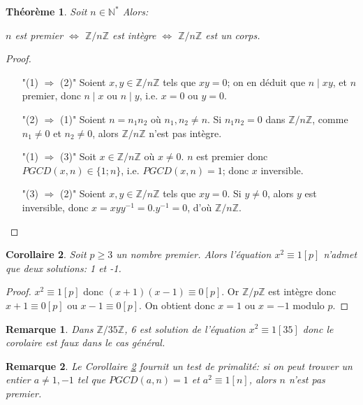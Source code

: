 \documentclass[10pt,a4paper]{report}
\newtheorem{thm}{Théorème}[chapter]
\newtheorem*{rem}{Remarque}
\newtheorem{Cor}[thm]{Corollaire}
\begin{document}
\begin{thm}
Soit $n \in \mathbb{N}^*$ Alors:\par 
$n$ est premier $\Longleftrightarrow$ $\mathbb{Z} / n \mathbb{Z}$ est intègre $\Longleftrightarrow$ $\mathbb{Z}/n\mathbb{Z}$ est un corps.
\end{thm}


\begin{proof}\
\begin{itemize}
\item["(1) $ \Rightarrow$ (2)"] Soient $x,y \in \mathbb{Z}/n\mathbb{Z}$ tels que $xy=0$; on en déduit que $n \mid xy$, et $n$ premier, donc $n \mid x$ ou $n \mid y$, i.e. $x=0$ ou $y=0$.
\item["(2) $\Rightarrow$ (1)"] Soient $n=n_1 n_2$ où $n_1,n_2 \neq n$. Si $n_1 n_2=0$ dans $\mathbb{Z}/n\mathbb{Z}$, comme $n_1 \neq 0$ et $n_2 \neq 0$, alors $\mathbb{Z}/n\mathbb{Z}$ n'est pas intègre.
\item["(1) $\Rightarrow$ (3)"] Soit $x \in \mathbb{Z}/n \mathbb{Z}$ où $x \neq 0$. $n$ est premier donc $PGCD(x,n)\in \{ 1;n  \}$, i.e. $PGCD(x,n)=1$; donc $x$ inversible.
\item["(3) $\Rightarrow$ (2)"]   Soient $x,y \in \mathbb{Z}/n \mathbb{Z}$ tels que $xy=0$. Si $y \neq 0$, alors $y$ est inversible, donc $x=xyy^{-1}=0. y^{-1}=0$, d'où $\mathbb{Z}/n\mathbb{Z}$.
\end{itemize}
\end{proof}

\begin{Cor}\label{Cor}
Soit $p\geqslant 3$ un nombre premier. Alors l'équation $x^2 \equiv 1 [p]$ n'admet que deux solutions: 1 et -1.
\end{Cor}

\begin{proof}
$x^2 \equiv 1 [p]$ donc $(x+1)(x-1) \equiv 0 [p]$. Or $\mathbb{Z}/p\mathbb{Z}$ est intègre donc $x+1 \equiv 0 [p]$ ou $x-1 \equiv 0 [p]$. On obtient donc $x=1$ ou $x=-1$ modulo $p$. 
\end{proof}

\begin{rem}
Dans $\mathbb{Z}/35 \mathbb{Z}$, 6 est solution de l'équation $x^2\equiv 1[35]$ donc le corolaire est faux dans le cas général.
\end{rem}

\begin{rem}
Le Corollaire \ref{Cor} fournit un test de primalité: si on peut trouver un entier $a \neq 1,-1$ tel que $PGCD(a,n)=1$ et $a^2 \equiv 1 [n]$, alors $n$ n'est pas premier. 
\end{rem}
\end{document}
